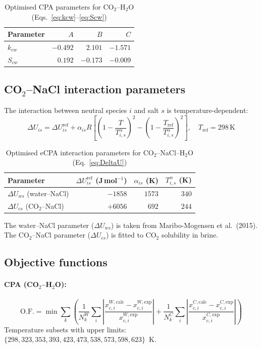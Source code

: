 \documentclass[11pt]{article}
\begin{document}
\begin{table}[h]
  \centering
  \caption{Optimised CPA parameters for CO$_2$--H$_2$O (Eqs.~\ref{eq:kcw}--\ref{eq:Scw})}
  \begin{tabular}{lrrr}
    \toprule
    Parameter & $A$ & $B$ & $C$ \\ \midrule
    $k_{cw}$  & $-0.492$ & $2.101$ & $-1.571$ \\
    $S_{cw}$  & $0.192$  & $-0.173$ & $-0.009$ \\
    \bottomrule
  \end{tabular}
\end{table}

\subsection{CO$_2$--NaCl interaction parameters}
The interaction between neutral species $i$ and salt $s$ is temperature-dependent:
\begin{equation}
  \Delta U_{is} = \Delta U_{is}^{\text{ref}}
    + \alpha_{is} R\!\left[
      \left(1 - \frac{T}{T_{i,s}^\alpha}\right)^2
      - \left(1 - \frac{T_{\text{ref}}}{T_{i,s}^\alpha}\right)^2
    \right], \quad T_{\text{ref}} = 298\,\text{K}
  \label{eq:DeltaU}
\end{equation}

\begin{table}[h]
  \centering
  \caption{Optimised eCPA interaction parameters for CO$_2$--NaCl--H$_2$O (Eq.~\ref{eq:DeltaU})}
  \begin{tabular}{lrrr}
    \toprule
    Parameter & $\Delta U_{is}^{\text{ref}}$ (J\,mol$^{-1}$) & $\alpha_{is}$ (K) & $T_{i,s}^\alpha$ (K) \\ \midrule
    $\Delta U_{ws}$ (water--NaCl)  & $-1858$ & $1573$ & $340$ \\
    $\Delta U_{cs}$ (CO$_2$--NaCl) & $+6056$ & $692$  & $244$ \\
    \bottomrule
  \end{tabular}
\end{table}

The water--NaCl parameter ($\Delta U_{ws}$) is taken from Maribo-Mogensen et al.\ (2015).
The CO$_2$--NaCl parameter ($\Delta U_{cs}$) is fitted to CO$_2$ solubility in brine.

\subsection{Objective functions}
\paragraph{CPA (CO$_2$--H$_2$O):}
\begin{equation}
  \text{O.F.} = \min \sum_k
    \left(\frac{1}{N_k^W}\sum_i\left|\frac{x_{c,i}^{W,\text{calc}}-x_{c,i}^{W,\text{exp}}}{x_{c,i}^{W,\text{exp}}}\right|
    + \frac{1}{N_k^C}\sum_i\left|\frac{x_{c,i}^{C,\text{calc}}-x_{c,i}^{C,\text{exp}}}{x_{c,i}^{C,\text{exp}}}\right|\right)
\end{equation}
Temperature subsets with upper limits: $\{298, 323, 353, 393, 423, 473, 538, 573, 598, 623\}$~K.
\end{document}
